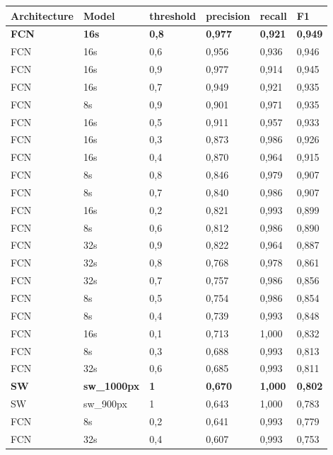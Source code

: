 \documentclass[a4paper,authoryear,review]{elsarticle}
\begin{document}
\begin{table}[]
	\tiny
	\begin{tabular}{llllll}
		\hline
		\textbf{Architecture} & \textbf{Model}      & \textbf{threshold} & \textbf{precision} & \textbf{recall} & \textbf{F1}    \\ \hline
		\textbf{FCN}          & \textbf{16s}        & \textbf{0,8}       & \textbf{0,977}     & \textbf{0,921}  & \textbf{0,949} \\
		FCN & 16s        & 0,6 & 0,956 & 0,936 & 0,946 \\
		FCN & 16s        & 0,9 & 0,977 & 0,914 & 0,945 \\
		FCN & 16s        & 0,7 & 0,949 & 0,921 & 0,935 \\
		FCN & 8s         & 0,9 & 0,901 & 0,971 & 0,935 \\
		FCN & 16s        & 0,5 & 0,911 & 0,957 & 0,933 \\
		FCN & 16s        & 0,3 & 0,873 & 0,986 & 0,926 \\
		FCN & 16s        & 0,4 & 0,870 & 0,964 & 0,915 \\
		FCN & 8s         & 0,8 & 0,846 & 0,979 & 0,907 \\
		FCN & 8s         & 0,7 & 0,840 & 0,986 & 0,907 \\
		FCN & 16s        & 0,2 & 0,821 & 0,993 & 0,899 \\
		FCN & 8s         & 0,6 & 0,812 & 0,986 & 0,890 \\
		FCN & 32s        & 0,9 & 0,822 & 0,964 & 0,887 \\
		FCN & 32s        & 0,8 & 0,768 & 0,978 & 0,861 \\
		FCN & 32s        & 0,7 & 0,757 & 0,986 & 0,856 \\
		FCN & 8s         & 0,5 & 0,754 & 0,986 & 0,854 \\
		FCN & 8s         & 0,4 & 0,739 & 0,993 & 0,848 \\
		FCN & 16s        & 0,1 & 0,713 & 1,000 & 0,832 \\
		FCN & 8s         & 0,3 & 0,688 & 0,993 & 0,813 \\
		FCN & 32s        & 0,6 & 0,685 & 0,993 & 0,811 \\
		\textbf{SW}           & \textbf{sw\_1000px} & \textbf{1}         & \textbf{0,670}     & \textbf{1,000}  & \textbf{0,802} \\
		SW  & sw\_900px  & 1   & 0,643 & 1,000 & 0,783 \\
		FCN & 8s         & 0,2 & 0,641 & 0,993 & 0,779 \\
		FCN & 32s        & 0,4 & 0,607 & 0,993 & 0,753 \\

\end{tabular}
\end{table}
\end{document}
